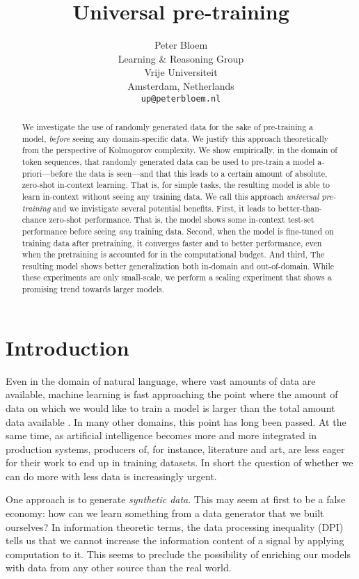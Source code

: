 \documentclass{article} %
\title{Universal pre-training}
\author{Peter Bloem \\
Learning \& Reasoning Group\\
Vrije Universiteit \\
Amsterdam, Netherlands \\
\texttt{up@peterbloem.nl} \\
}
\begin{document}
\maketitle

\begin{abstract}
We investigate the use of randomly generated data for the sake of pre-training a model, \emph{before} seeing any domain-specific data. We justify this approach theoretically from the perspective of Kolmogorov complexity. We show empirically, in the domain of token sequences, that randomly generated data can be used to pre-train a model a-priori---before the data is seen---and that this leads to a certain amount of absolute, zero-shot in-context learning. That is, for simple tasks, the resulting model is able to learn in-context without seeing any training data. We call this approach \emph{universal pre-training} and we invistigate several potential benefits. First, it leads to better-than-chance zero-shot performance. That is, the model shows some in-context test-set performance before seeing \emph{any} training data. Second, when the model is fine-tuned on training data after pretraining, it converges faster and to better performance, even when the pretraining is accounted for in the computational budget. And third, The resulting model shows better generalization both in-domain and out-of-domain. While these experiments are only small-scale, we perform a scaling experiment that shows a promising trend towards larger models.
\end{abstract}

\section{Introduction}

Even in the domain of natural language, where vast amounts of data are available, machine learning is fast approaching the point where the amount of data on which we would like to train a model is larger than the total amount data available \cite{}. In many other domains, this point has long been passed. At the same time, as artificial intelligence becomes more and more integrated in production systems, producers of, for instance, literature and art, are less eager for their work to end up in training datasets. In short the question of whether we can do more with less data is increasingly urgent.

One approach is to generate \emph{synthetic data}. This may seem at first to be a false economy: how can we learn something from a data generator that we built ourselves? In information theoretic terms, the data processing inequality (DPI) \cite{} tells us that we cannot increase the information content of a signal by applying computation to it. This seems to preclude the possibility of enriching our models with data from any other source than the real world.
\end{document}
